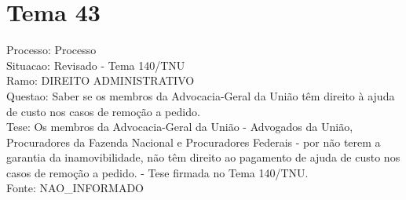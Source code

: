 \documentclass[12pt]{article}
\begin{document}
\section*{Tema 43}
Processo: Processo\\
Situacao: Revisado - Tema 140/TNU\\
Ramo: DIREITO ADMINISTRATIVO\\
Questao: Saber se os membros da Advocacia-Geral da União têm direito à ajuda de custo nos casos de remoção a pedido.\\
Tese: Os membros da Advocacia-Geral da União - Advogados da União, Procuradores da Fazenda Nacional e Procuradores Federais - por não terem a garantia da inamovibilidade, não têm direito ao pagamento de ajuda de custo nos casos de remoção a pedido. - Tese firmada no Tema 140/TNU.\\
Fonte: NAO\_INFORMADO
\end{document}
